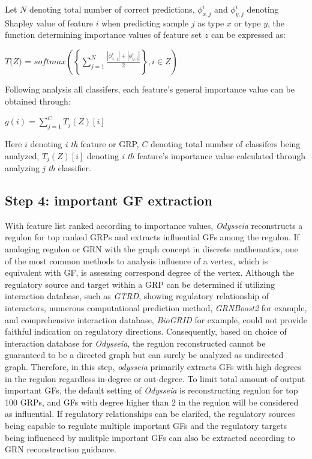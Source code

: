 \documentclass[fleqn,10pt]{wlscirep}
\begin{document}
Let $N$ denoting total number of correct predictions, $\phi_{x,j}^{i}$ and $\phi_{y,j}^{i}$ denoting Shapley value of feature $i$ when predicting sample $j$ as type $x$ or type $y$, the function determining importance values of feature set $z$ can be expressed as:

\centerline{$\textit{T(Z) = softmax}(\left\{\sum_{j = 1}^{N}\frac{\left|\phi_{x,j}^{i}\right| + \left|\phi_{y,j}^{i}\right|}{2}\right\}, i \in Z)$}

Following analysis all classifers, each feature's general importance value can be obtained through:

\centerline{$g(i) = \sum_{j = 1}^{C}T_{j}(Z)[i]$}

Here $i$ denoting \emph{i th} feature or GRP, $C$ denoting total number of classifers being analyzed, $T_{j}(Z)[i]$ denoting \emph{i th} feature's importance value calculated through analyzing \emph{j th} classifier.

\subsection*{Step 4: important GF extraction}
\label{step4}
With feature list ranked according to importance values, \emph{Odysseia} reconstructs a regulon for top ranked GRPs and extracts influential GFs among the regulon.
If analoging regulon or GRN with the graph concept in discrete mathematics, one of the most common methods to analysis influence of a vertex, which is equivalent with GF, is assessing correspond degree of the vertex.
Although the regulatory source and target within a GRP can be determined if utilizing interaction database, such as \emph{GTRD}\cite{gkaa1057}, showing regulatory relationship of interactors, numerous computational prediction method, \emph{GRNBoost2}\cite{grnboost2} for example, and comprehensive interaction database, \emph{BioGRID}\cite{biogrid} for example, could not provide faithful indication on regulatory directions.
Consequently, based on choice of interaction database for \emph{Odysseia}, the regulon reconstructed cannot be guaranteed to be a directed graph but can surely be analyzed as undirected graph.
Therefore, in this step, \emph{odysseia} primarily extracts GFs with high degrees in the regulon regardless in-degree or out-degree.
To limit total amount of output important GFs, the default setting of \emph{Odysseia} is reconstructing regulon for top 100 GRPs, and GFs with degree higher than 2 in the regulon will be considered as influential.
If regulatory relationships can be clarifed, the regulatory sources being capable to regulate multiple important GFs and the regulatory targets being influenced by mulitple important GFs can also be extracted according to GRN reconstruction guidance.
\end{document}
